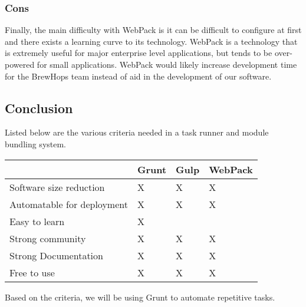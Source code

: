 \documentclass[draftclsnofoot,onecolumn,letterpaper,10pt,compsoc]{IEEEtran}
\begin{document}
        \subsubsection{Cons}
            Finally, the main difficulty with WebPack is it can be difficult to configure at first and there exists a learning curve to its technology\cite{TaskRunners}.
            WebPack is a technology that is extremely useful for major enterprise level applications, but tends to be over-powered for small applications.
            WebPack would likely increase development time for the BrewHops team instead of aid in the development of our software.
            
    \subsection{Conclusion}
        Listed below are the various criteria needed in a task runner and module bundling system.
    
    \begin{center}
            \begin{tabular}{| m{15em} | m{10em} | m{10em} | m{10em} |}
                \hline
                    & Grunt & Gulp & WebPack \\
                
                \hline
                    Software size reduction & X & X & X \\
                    
                \hline
                    Automatable for deployment & X & X & X \\
                    
                \hline
                    Easy to learn & X &  &  \\
                
                \hline
                    Strong community & X & X & X \\
                    
                \hline
                    Strong Documentation & X & X & X \\
                    
                \hline
                    Free to use & X & X & X \\
                    
                \hline
            \end{tabular}
        \end{center}
        
        Based on the criteria, we will be using Grunt to automate repetitive tasks.

{}

\end{document}
